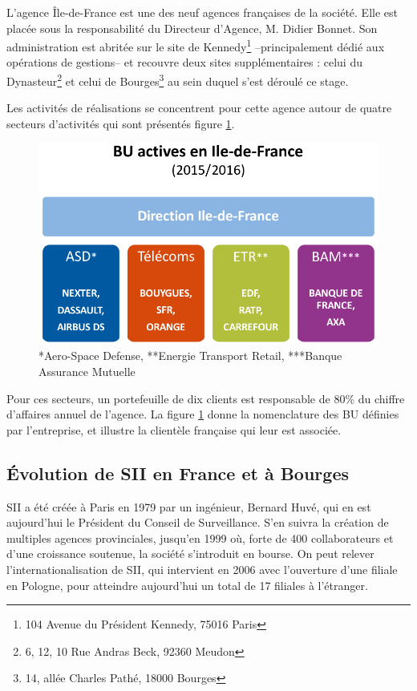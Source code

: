 L'agence Île-de-France est une des neuf agences françaises de la société. Elle est placée sous la responsabilité du Directeur d'Agence, M. Didier Bonnet.
Son administration est abritée sur le site de Kennedy\footnote{104 Avenue du Président Kennedy, 75016 Paris} --principalement dédié aux opérations de gestions-- et recouvre deux sites supplémentaires : celui du 
Dynasteur\footnote{6, 12, 10 Rue Andras Beck, 92360 Meudon} et celui de Bourges\footnote{14, allée Charles Pathé, 18000 Bourges } au sein duquel s'est déroulé ce stage. 

Les activités de réalisations se concentrent pour cette agence autour de quatre secteurs d'activités qui sont présentés figure \ref{fig:BU-IDF}. 

\begin{figure}[h]
  \centering
    \includegraphics[width=.5\linewidth]{figures/BU-clients-IDF}
    \caption*{*Aero-Space Defense, **Energie Transport Retail, ***Banque Assurance Mutuelle}  
  \label{fig:BU-IDF}
\end{figure}

Pour ces secteurs, un portefeuille de dix clients est responsable de 80\% du chiffre d'affaires annuel de l'agence. 
La figure \ref{fig:BU-IDF} donne la nomenclature des \gls{BU} définies par l'entreprise, et illustre la clientèle française qui leur est associée.  

\subsection{\'{E}volution de SII en France et à Bourges}

SII a été créée à Paris en 1979 par un ingénieur, Bernard Huvé, qui en est aujourd'hui le Président du Conseil de Surveillance. 
S'en suivra la création de multiples agences provinciales, jusqu'en 1999 où, forte de 400 collaborateurs et d'une croissance soutenue, la société s'introduit en bourse.  
On peut relever l'internationalisation de SII, qui intervient en 2006 avec l'ouverture d'une filiale en Pologne, pour atteindre aujourd'hui un total de 17 filiales à l'étranger\cite{Bib_exercice_2015_2016}.  

